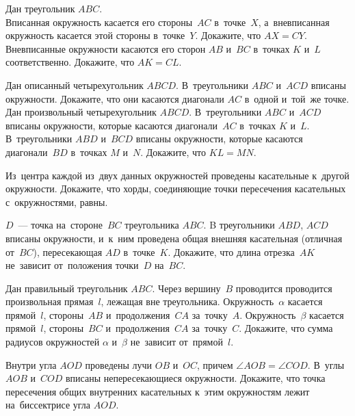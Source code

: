 


\begin{problems}

\item
Дан треугольник $ABC$.
\\
\subproblem
Вписанная окружность касается его стороны~$AC$ в~точке~$X$, а~вневписанная
окружность касается этой стороны в~точке~$Y$.
Докажите, что $AX = CY$.
\\
\subproblem
Вневписанные окружности касаются его сторон $AB$ и~$BC$ в~точках $K$ и~$L$
соответственно.
Докажите, что $AK = CL$.

\item
\subproblem
Дан описанный четырехугольник $ABCD$.
В~треугольники $ABC$ и~$ACD$ вписаны окружности.
Докажите, что они касаются диагонали $AC$ в~одной и~той~же точке.
\\
\subproblem
Дан произвольный четырехугольник $ABCD$.
В~треугольники $ABC$ и~$ACD$ вписаны окружности, которые касаются
диагонали~$AC$ в~точках $K$ и~$L$.
В~треугольники $ABD$ и~$BCD$ вписаны окружности, которые касаются
диагонали~$BD$ в~точках $M$ и~$N$.
Докажите, что $KL = MN$.

\item
Из~центра каждой из~двух данных окружностей проведены касательные к~другой
окружности.
Докажите, что хорды, соединяющие точки пересечения касательных с~окружностями, 
равны.

\item
$D$~--- точка на~стороне~$BC$ треугольника $ABC$.
B треугольники $ABD$, $ACD$ вписаны окружности, и~к~ним проведена общая внешняя
касательная (отличная от~$BC$), пересекающая $AD$ в~точке~$K$.
Докажите, что длина отрезка~$AK$ не~зависит от~положения точки~$D$ на~$BC$.

\item
Дан правильный треугольник $ABC$.
Через вершину~$B$ проводится проводится произвольная прямая~$l$, лежащая вне
треугольника.
Окружность~$\alpha$ касается прямой~$l$, стороны~$AB$ и~продолжения~$CA$
за~точку~$A$.
Окружность~$\beta$ касается прямой~$l$, стороны~$BC$ и~продолжения~$CA$
за~точку~$C$.
Докажите, что сумма радиусов окружностей $\alpha$ и~$\beta$ не~зависит
от~прямой~$l$.

\item
Внутри угла $AOD$ проведены лучи $OB$ и~$OC$, причем
$\angle AOB = \angle COD$.
В~углы $AOB$ и~$COD$ вписаны непересекающиеся окружности.
Докажите, что точка пересечения общих внутренних касательных к~этим окружностям
лежит на~биссектрисе угла $AOD$.


\end{problems}
